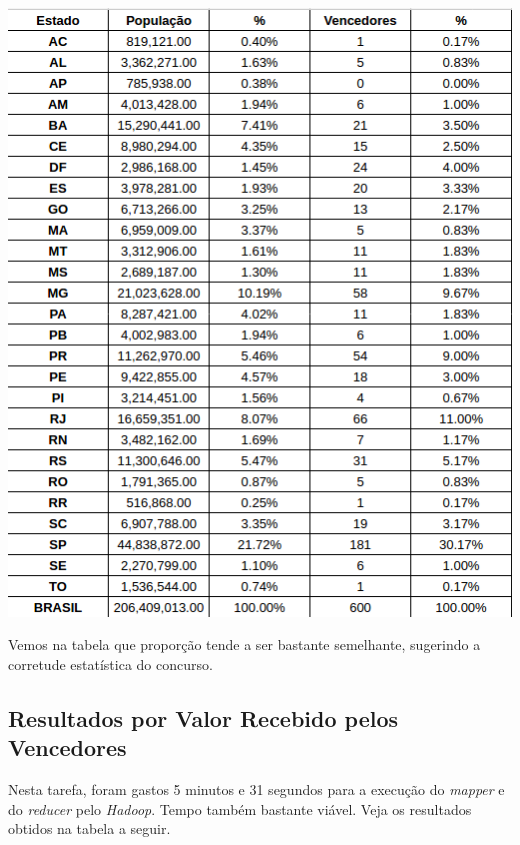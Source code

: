 \documentclass[a4paper,10pt]{article}
\begin{document}
\includegraphics[scale=0.5]{table1}

Vemos na tabela que proporção tende a ser bastante semelhante, sugerindo a corretude estatística do concurso.

\subsection{Resultados por Valor Recebido pelos Vencedores}
Nesta tarefa, foram gastos 5 minutos e 31 segundos para a execução do \textit{mapper} e do \textit{reducer} pelo \textit{Hadoop}. Tempo também bastante viável. Veja os resultados obtidos na tabela a seguir.
\end{document}
